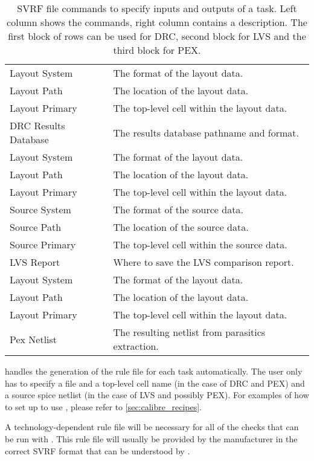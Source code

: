 \begin{table}[h]
	\begin{center}
\begin{tabular}{l|l}
Layout System & The format of the layout data.\\
Layout Path & The location of the layout data.\\
Layout Primary & The top-level cell within the layout data.\\
DRC Results Database & The results database pathname and format.\\
\hline
Layout System & The format of the layout data.\\
Layout Path & The location of the layout data.\\
Layout Primary & The top-level cell within the layout data.\\
Source System & The format of the source data.\\
Source Path & The location of the source data.\\
Source Primary & The top-level cell within the source data.\\
LVS Report & Where to save the LVS comparison report.\\
\hline
Layout System & The format of the layout data.\\
Layout Path & The location of the layout data.\\
Layout Primary & The top-level cell within the layout data.\\
Pex Netlist & The resulting netlist from parasitics extraction.
\end{tabular}
\caption{\gls{SVRF} file commands to specify inputs and outputs of a
 task. Left column shows the commands, right column contains a
description. The first block of rows can be used for \gls{DRC}, second block
for \gls{LVS} and the third block for \gls{PEX}.}
\label{tab:svrf}
	\end{center}
\end{table}

 handles the generation of the rule file for each task automatically.
The user only has to specify a  file and a top-level cell name (in
the case of \gls{DRC} and \gls{PEX}) and a source \gls{spice} netlist (in the
case of \gls{LVS} and possibly \gls{PEX}). For examples of how to set up
 to use , please refer to \cref{sec:calibre_recipes}.

A technology-dependent rule file will be necessary for all of the checks that
can be run with . This rule file will usually be provided by the
manufacturer in the correct \gls{SVRF} format that can be understood by
.

